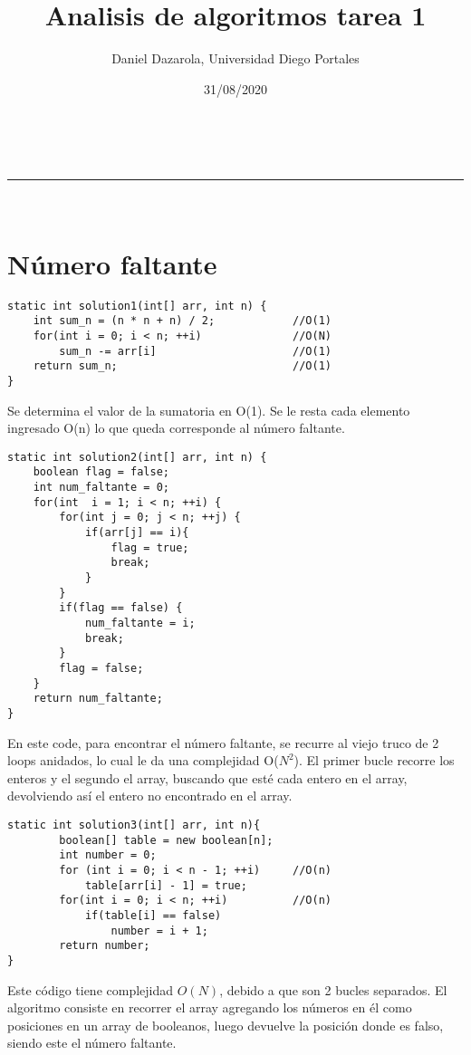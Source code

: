 \documentclass[a4paper,11pt]{article}
\makeatletter
\newcommand{\linia}{\rule{\linewidth}{0.5pt}}
\theoremstyle{mytheor}
\renewcommand{\maketitle}{
\begin{center}
\vspace{2ex}
{\huge \textsc{\@title}}
\vspace{1ex}
\\
\linia\\
\@author \hfill \@date
\vspace{4ex}
\end{center}
}
\makeatother
\begin{document}
\title{Analisis de algoritmos tarea 1}

\author{Daniel Dazarola, Universidad Diego Portales}

\date{31/08/2020}


\maketitle

\section*{Número faltante}

\begin{lstlisting}[label={list:first},caption=Solución 1.]
static int solution1(int[] arr, int n) {
	int sum_n = (n * n + n) / 2;			//O(1)
	for(int i = 0; i < n; ++i)				//O(N)
		sum_n -= arr[i]						//O(1)
	return sum_n;							//O(1)
}
\end{lstlisting}
Se determina el valor de la sumatoria en O(1). Se le resta cada elemento ingresado O(n) lo que queda corresponde al número faltante.

\begin{lstlisting}[label={list:second},caption=Solución 2.]
static int solution2(int[] arr, int n) {
	boolean flag = false;
	int num_faltante = 0;
	for(int  i = 1; i < n; ++i) {
		for(int j = 0; j < n; ++j) {
			if(arr[j] == i){
				flag = true;
				break;
			}
		}
		if(flag == false) {
			num_faltante = i;
			break;
		}
		flag = false;
	}
	return num_faltante;
}
\end{lstlisting}
En este code, para encontrar el número faltante, se recurre al viejo truco de 2 loops anidados, lo cual le da una complejidad O($N^{2}$). El primer bucle recorre los enteros y el segundo el array, buscando que esté cada entero en el array, devolviendo así el entero no encontrado en el array.



\begin{lstlisting}[label={list:third},caption=Solución 3.]
static int solution3(int[] arr, int n){
        boolean[] table = new boolean[n];
        int number = 0;
        for (int i = 0; i < n - 1; ++i) 	//O(n)
            table[arr[i] - 1] = true; 
        for(int i = 0; i < n; ++i)			//O(n)
            if(table[i] == false) 
                number = i + 1;
        return number;
}
\end{lstlisting}
Este código tiene complejidad $O(N)$, debido a que son 2 bucles separados. El algoritmo consiste en recorrer el array agregando los números en él como posiciones en un array de booleanos, luego devuelve la posición donde es falso, siendo este el número faltante.
\end{document}
